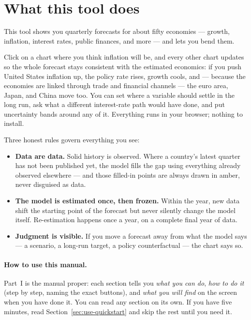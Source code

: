 \documentclass[11pt]{article}
\theoremstyle{definition}
\theoremstyle{remark}
\begin{document}
\clearpage
\tableofcontents
\clearpage

\section{What this tool does}\label{sec:whatis}

This tool shows you quarterly forecasts for about fifty economies --- growth, inflation,
interest rates, public finances, and more --- and lets you bend them.

Click on a chart where you think inflation will be, and every other chart updates so the whole
forecast stays consistent with the estimated economics: if you push United States inflation up,
the policy rate rises, growth cools, and --- because the economies are linked through trade and
financial channels --- the euro area, Japan, and China move too. You can set where a variable
should settle in the long run, ask what a different interest-rate path would have done, and put
uncertainty bands around any of it. Everything runs in your browser; nothing to install.

Three honest rules govern everything you see:
\begin{itemize}
  \item \textbf{Data are data.} Solid history is observed. Where a country's latest quarter has
    not been published yet, the model fills the gap using everything already observed elsewhere
    --- and those filled-in points are always drawn in amber, never disguised as data.
  \item \textbf{The model is estimated once, then frozen.} Within the year, new data shift the
    starting point of the forecast but never silently change the model itself. Re-estimation
    happens once a year, on a complete final year of data.
  \item \textbf{Judgment is visible.} If you move a forecast away from what the model says ---
    a scenario, a long-run target, a policy counterfactual --- the chart says so.
\end{itemize}

\paragraph{How to use this manual.}
Part~I is the manual proper: each section tells you \emph{what you can do}, \emph{how to do it}
(step by step, naming the exact buttons), and \emph{what you will find} on the screen when you
have done it. You can read any section on its own. If you have five minutes, read
Section~\ref{sec:use-quickstart} and skip the rest until you need it.
\end{document}
